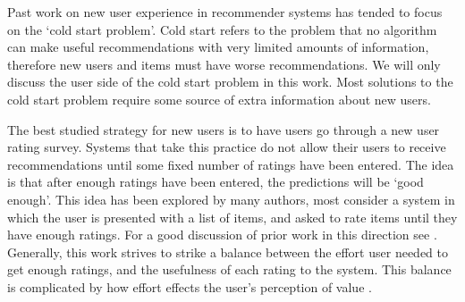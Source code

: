 \documentclass[letterpaper]{sig-alternate}
\begin{document}

  Past work on new user experience in recommender systems has tended to focus on the `cold start problem'.
  Cold start refers to the problem that no algorithm can make useful recommendations with very limited amounts of information, therefore new users and items must have worse recommendations.
  We will only discuss the user side of the cold start problem in this work.
  Most solutions to the cold start problem require some source of extra information about new users.
  
  The best studied strategy for new users is to have users go through a new user rating survey.
  Systems that take this practice do not allow their users to receive recommendations until some fixed number of ratings have been entered.
  The idea is that after enough ratings have been entered, the predictions will be `good enough'.
  This idea has been explored by many authors, most consider a system in which the user is presented with a list of items, and asked to rate items until they have enough ratings.
  For a good discussion of prior work in this direction see \cite{adaptiveBootstrapping}.
  Generally, this work strives to strike a balance between the effort user needed to get enough ratings, and the usefulness of each rating to the system.
  This balance is complicated by how effort effects the user's perception of value \cite{TenIsEnough}.
\end{document}
